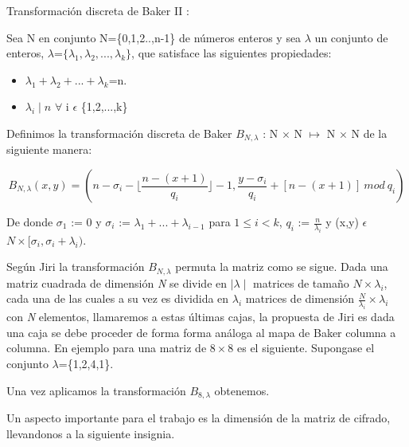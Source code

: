 \begin{defi} Transformaci\'on discreta de Baker II :

Sea N en conjunto N=\{0,1,2..,n-1\} de n\'umeros enteros y sea $\lambda$ un conjunto de enteros, $\lambda$=$\{\lambda_{1}, \lambda_{2},...,\lambda_{k}\}$, que satisface las siguientes propiedades:

\begin{itemize}
	\item $\lambda_{1}+\lambda_{2}+...+\lambda_{k}$=n.
	\item $\lambda_{i}\mid n$ $\forall$ i $\epsilon$ \{1,2,...,k\}
\end{itemize}

Definimos la transformaci\'on discreta de Baker $B_{N,\lambda}$ : N $\times$ N $\longmapsto$ N $\times$ N de la siguiente manera:

\begin{equation}
  B_{N,\lambda}(x,y) = ( n - \sigma_{i} - \lfloor\frac{n-(x+1)}{q_{i}}\rfloor -1 , \frac{y-\sigma_{i}}{q_{i}} + [n-(x+1)] \ mod \ q_{i} ) 
\end{equation}

De donde $\sigma_{1}$ := 0 y $\sigma_{i}$ := $\lambda_{1}+...+\lambda_{i-1}$ para $1 \leq i < k$, $q_{i}$ := $\frac{n}{\lambda_{i}}$ y (x,y) $\epsilon$ $ N \times [\sigma_{i},\sigma_{i}+\lambda_{i})$.

\end{defi}

Seg\'un Jiri\cite{Jiri} la transformaci\'on $B_{N,\lambda}$ permuta la matriz como se sigue. Dada una matriz cuadrada de dimensi\'on \emph{N} se divide en $\mid\lambda\mid$ matrices de tama\~no $N\times\lambda_{i}$, cada una de las cuales a su vez es dividida en $\lambda_{i}$ matrices de dimensi\'on $\frac{N}{\lambda_{i}}\times\lambda_{i}$ con \emph{N} elementos, llamaremos a estas \'ultimas cajas, la propuesta de Jiri\cite{Jiri} es dada una caja se debe proceder de forma forma an\'aloga al mapa de Baker columna a columna. En ejemplo para una matriz de $8\times8$ es el siguiente. Supongase el conjunto $\lambda$=\{1,2,4,1\}.


Una vez aplicamos la transformaci\'on $B_{8,\lambda}$ obtenemos.


Un aspecto importante para el trabajo es la dimensi\'on de la matriz de cifrado, llevandonos a la siguiente insignia.

